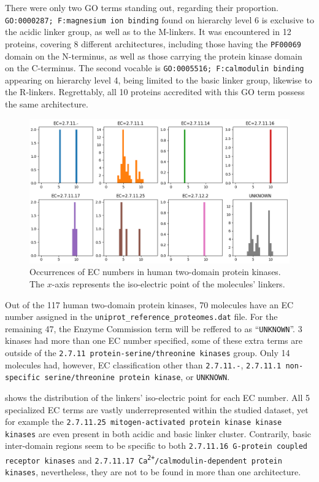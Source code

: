 		There were only two GO terms standing out, regarding their proportion.
		\texttt{GO:0000287; F:magnesium ion binding} found on hierarchy level 6 is exclusive
		to the acidic linker group, as well as to the M-linkers.
		It was encountered in 12 proteins, covering 8 different architectures, including those
		having the \texttt{PF00069} domain on the N-terminus, as well as those carrying the
		protein kinase domain on the C-terminus.
		The second vocable is \texttt{GO:0005516; F:calmodulin binding} appearing on hierarchy
		level 4, being limited to the basic linker group, likewise to the R-linkers.
		Regrettably, all 10 proteins accredited with this GO term possess the same
		architecture.

	\label{res:first:ec}

		\begin{figure}
			\centering
			\includegraphics[width=\linewidth]{img/iso_density_ec.png}
			\caption{Occurrences of EC numbers in human two-domain protein kinases. The $x$-axis
			represents the iso-electric point of the molecules' linkers.}
			\label{fig:ec}
		\end{figure}

		Out of the 117 human two-domain protein kinases, 70 molecules have an EC number
		assigned in the \texttt{uniprot\_reference\_proteomes.dat} file.
		For the remaining 47, the Enzyme Commission term will be reffered to as
		``\texttt{UNKNOWN}''.
		3 kinases had more than one EC number specified, some of these extra terms are
		outside of the \texttt{2.7.11 protein-serine/threonine kinases} group.
		Only 14 molecules had, however, EC classification other than \texttt{2.7.11.-},
		\texttt{2.7.11.1 non-specific serine/threonine protein kinase}, or \texttt{UNKNOWN}.

		 shows the distribution of the linkers' iso-electric point for each EC
		number.
		All 5 specialized EC terms are vastly underrepresented within the studied dataset, yet
		for example the \texttt{2.7.11.25 mitogen-activated protein kinase kinase kinases}
		are even present in both acidic and basic linker cluster.
		Contrarily, basic inter-domain regions seem to be specific to both \texttt{2.7.11.16
		G-protein coupled receptor kinases} and
		\texttt{2.7.11.17 Ca\textsuperscript{2+}/calmodulin-dependent protein kinases},
		nevertheless, they are not to be found in more than one architecture.

